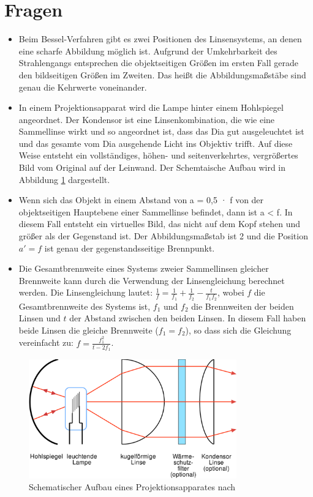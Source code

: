 \documentclass[11pt, a4paper]{article}
\begin{document}
    \section{Fragen}
    \begin{itemize}
        \item Beim Bessel-Verfahren gibt es zwei Positionen des Linsensystems, an denen eine scharfe Abbildung möglich ist. Aufgrund der Umkehrbarkeit des Strahlengangs entsprechen die objektseitigen Größen im ersten Fall gerade den bildseitigen Größen im Zweiten. Das heißt die Abbildungsmaßstäbe sind genau die Kehrwerte voneinander.
        \item In einem Projektionsapparat wird die Lampe hinter einem Hohlspiegel angeordnet. Der Kondensor ist eine Linsenkombination, die wie eine Sammellinse wirkt und so angeordnet ist, dass das Dia gut ausgeleuchtet ist und das gesamte vom Dia ausgehende Licht ins Objektiv trifft. Auf diese Weise entsteht ein vollständiges, höhen- und seitenverkehrtes, vergrößertes Bild vom Original auf der Leinwand. Der Schemtaische Aufbau wird in Abbildung \ref{fig:projektionsapparat} dargestellt.
        \item Wenn sich das Objekt in einem Abstand von a = 0,5 · f von der objektseitigen Hauptebene einer Sammellinse befindet, dann ist a < f. In diesem Fall entsteht ein virtuelles Bild, das nicht auf dem Kopf stehen und größer als der Gegenstand ist. Der Abbildungsmaßstab ist 2 und die Position $a'= f$ ist genau der gegenstandsseitige Brennpunkt.
        \item Die Gesamtbrennweite eines Systems zweier Sammellinsen gleicher Brennweite kann durch die Verwendung der Linsengleichung berechnet werden. Die Linsengleichung lautet: $\frac{1}{f} = \frac{1}{f_1} + \frac{1}{f_2} - \frac{t}{f_1 f_2}$, wobei $f$ die Gesamtbrennweite des Systems ist, $f_1$ und $f_2$ die Brennweiten der beiden Linsen und $t$ der Abstand zwischen den beiden Linsen.
        In diesem Fall haben beide Linsen die gleiche Brennweite ($f_1 = f_2$), so dass sich die Gleichung vereinfacht zu: $f = \frac{f_1^2}{t-2f_1}$. 
    \end{itemize}

    \begin{figure}[h]
        \centering
        \includegraphics[width=0.8\textwidth]{Condensor-1-de.svg.png}
        \caption{Schematischer Aufbau eines Projektionsapparates nach \cite{projektionsapparat}}
        \label{fig:projektionsapparat}
    \end{figure}






    
    
\end{document}
